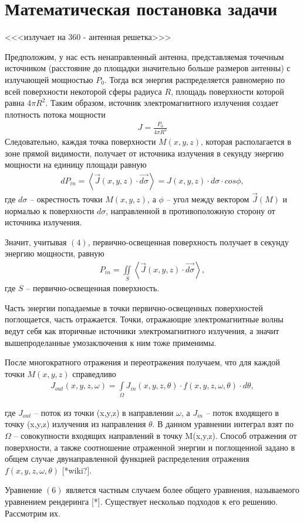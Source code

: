 \section*{Математическая постановка задачи}

<<<излучает на 360 - антенная решетка>>>

Предположим, у нас есть ненаправленный антенна, представляемая точечным источником (расстояние до площадки значительно больше размеров антенны) с излучающей мощностью $P_0$. Тогда вся энергия распределяется равномерно по всей поверхности некоторой сферы радиуса $R$, площадь поверхности которой равна $ 4 \pi R^2 $. Таким образом, источник электромагнитного излучения создает плотность потока мощности
\begin{gather}
   J = \frac{P_0}{4 \pi R^2}
\end{gather}
Следовательно, каждая точка поверхности $ M(x, y, z) $, которая располагается в зоне прямой видимости, получает от источника излучения в секунду энергию мощности на единицу площади равную
\begin{gather}
  dP_{in} =   \left\langle  {\vec{J}(x,y,z) \cdot  \vec{d\sigma} } \right\rangle = J(x,y,z) \cdot d\sigma \cdot cos \phi ,
\end{gather}
где $d\sigma$ -- окрестность точки $ M(x, y, z) $, а $\phi$ -- угол между вектором $ \vec{J}(M) $ и нормалью к поверхности $d\sigma$, направленной в противоположную сторону от источника излучения.  

Значит, учитывая $(4)$, первично-освещенная поверхность получает в секунду энергию мощности, равную 
\begin{gather}
  P_{in} =   \iint \limits_S \left\langle  {\vec{J}(x,y,z) \cdot  \vec{d\sigma} } \right\rangle,
\end{gather}
где $ S $ -- первично-освещенная поверхность.

Часть энергии попадаемые в точки первично-освещенных поверхностей поглощается, часть отражается. Точки, отражающие электромагнитные волны ведут себя как вторичные источники электромагнитного излучения, а значит вышепроделанные умозаключения к ним тоже применимы. 

После многократного отражения и переотражения получаем, что для каждой точки $ M(x,y,z) $ справедливо
\begin{gather}
  J_{out}(x,y,z,\omega) = \int \limits_\Omega J_{in}(x,y,z,\theta) \cdot f(x,y,z,\omega,\theta) \cdot d\theta,
\end{gather}

где $ J_{out} $ -- поток из точки (x,y,z) в направлении $ \omega $, а $ J_{in} $ -- поток входящего в точку (x,y,z) излучения из направления $ \theta $. В данном уравнении интеграл взят по $ \Omega $ -- совокупности входящих направлений в точку M(x,y,z). Способ отражения от поверхности, а также соотношение отраженной энергии и поглощенной задано в общем случае двунаправленной функцией распределения отражения $ f(x,y,z,\omega,\theta) $ [*wiki?]. 

Уравнение $(6)$ является частным случаем более общего уравнения, называемого уравнением рендеринга [*]. Существует несколько подходов к его решению. Рассмотрим их.
